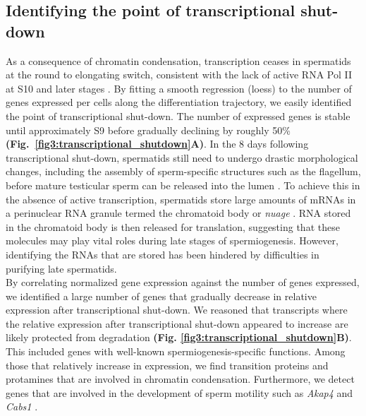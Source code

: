 \subsection{Identifying the point of transcriptional shut-down}

As a consequence of chromatin condensation, transcription ceases in spermatids at the round to elongating switch, consistent with the lack of active RNA Pol II at S10 and later stages \citep{DottermuschHeidel2014}.
By fitting a smooth regression (loess) to the number of genes expressed per cells along the differentiation trajectory, we easily identified the point of transcriptional shut-down. The number of expressed genes is stable until approximately S9 before gradually declining by roughly 50\% \textbf{(Fig.~\ref{fig3:transcriptional_shutdown}A)}. In the 8 days following transcriptional shut-down, spermatids still need to undergo drastic morphological changes, including the assembly of sperm-specific structures such as the flagellum, before mature testicular sperm can be released into the lumen \citep{ODonnell2014}. To achieve this in the absence of active transcription, spermatids store large amounts of mRNAs in a perinuclear RNA granule termed the chromatoid body or \emph{nuage} \citep{Kotaja2007}. RNA stored in the chromatoid body is then released for translation, suggesting that these molecules may play vital roles during late stages of spermiogenesis. However, identifying the RNAs that are stored has been hindered by difficulties in purifying late spermatids. \\

By correlating normalized gene expression against the number of genes expressed, we identified a large number of genes that gradually decrease in relative expression after transcriptional shut-down. We reasoned that transcripts where the relative expression after transcriptional shut-down appeared to increase are likely protected from degradation \textbf{(Fig. \ref{fig3:transcriptional_shutdown}B)}. This included genes with well-known spermiogenesis-specific functions. Among those that relatively increase in expression, we find transition proteins and protamines that are involved in chromatin condensation. Furthermore, we detect genes that are involved in the development of sperm motility such as \textit{Akap4} and \textit{Cabs1} \citep{Kawashima2009, Miki2002}. 

\newpage

